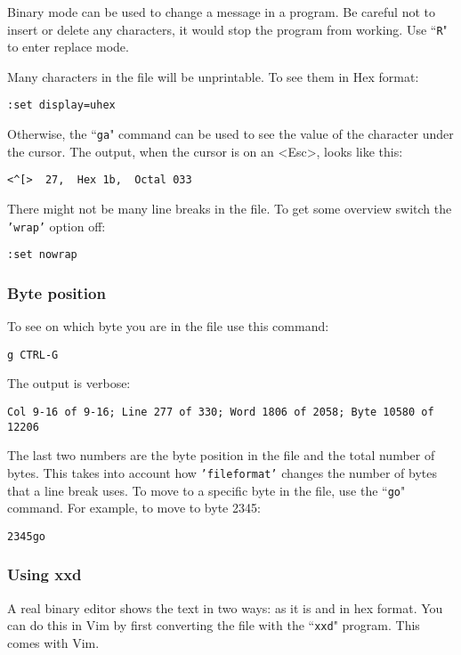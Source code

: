 Binary mode can be used to change a message in a program.
Be careful not to insert or delete any characters, it would stop the program from working.
Use ``\texttt{R}" to enter replace mode.

Many characters in the file will be unprintable.
To see them in Hex format:

\begin{Verbatim}[samepage=true]
 :set display=uhex
\end{Verbatim}

Otherwise, the ``\texttt{ga}" command can be used to see the value of the character under the cursor.
The output, when the cursor is on an <Esc>, looks like this:

\begin{Verbatim}[samepage=true]
    <^[>  27,  Hex 1b,  Octal 033
\end{Verbatim}

There might not be many line breaks in the file.
To get some overview switch the \texttt{'wrap'} option off:

\begin{Verbatim}[samepage=true]
 :set nowrap
\end{Verbatim}

\subsubsection{Byte position}
To see on which byte you are in the file use this command:

\begin{Verbatim}[samepage=true]
 g CTRL-G
\end{Verbatim}

The output is verbose:

\begin{Verbatim}[samepage=true]
    Col 9-16 of 9-16; Line 277 of 330; Word 1806 of 2058; Byte 10580 of 12206
\end{Verbatim}

The last two numbers are the byte position in the file and the total number of bytes.
This takes into account how \texttt{'fileformat'} changes the number of bytes that a line break uses.
To move to a specific byte in the file, use the ``\texttt{go}" command.
For example, to move to byte 2345:

\begin{Verbatim}[samepage=true]
 2345go
\end{Verbatim}

\subsubsection{Using xxd}
A real binary editor shows the text in two ways: as it is and in hex format.
You can do this in Vim by first converting the file with the ``\texttt{xxd}" program.
This comes with Vim.

